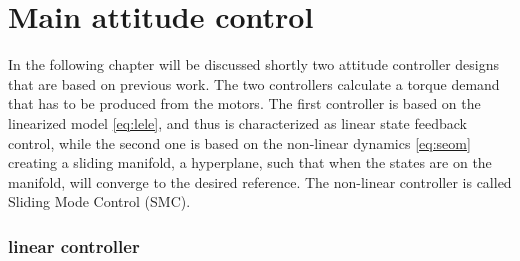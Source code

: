 \chapter{Main attitude control}

In the following chapter will be discussed shortly two attitude controller designs that are based on previous work. The two controllers calculate a torque demand that has to be produced from the motors. The first controller is based on the linearized model \eqref{eq:lele}, and thus is characterized as linear state feedback control, while the second one is based on the non-linear dynamics \eqref{eq:seom} creating a sliding manifold, a hyperplane, such that when the states are on the manifold, will converge to the desired reference. The non-linear controller is called Sliding Mode Control (SMC).
  
 \subsection{linear controller}
 
